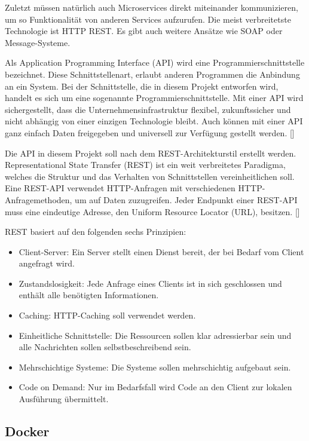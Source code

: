 Zuletzt müssen natürlich auch Microservices direkt miteinander kommunizieren, um so Funktionalität von anderen Services aufzurufen. Die meist verbreitetste Technologie ist HTTP REST. Es gibt auch weitere Ansätze wie SOAP oder Message-Systeme.

Als Application Programming Interface (API) wird eine Programmierschnittstelle bezeichnet. Diese Schnittstellenart, erlaubt anderen Programmen die Anbindung an ein System. Bei der Schnittstelle, die in diesem Projekt entworfen wird, handelt es sich um eine sogenannte Programmierschnittstelle. Mit einer API wird sichergestellt, dass die Unternehmensinfrastruktur flexibel, zukunftssicher und nicht abhängig von einer einzigen Technologie bleibt. Auch können mit einer API ganz einfach Daten freigegeben und universell zur Verfügung gestellt werden. [\cite[S. 95ff]{koflerDigitale2018}]

Die API in diesem Projekt soll nach dem REST-Architekturstil erstellt werden. Representational State Transfer (REST) ist ein weit verbreitetes Paradigma, welches die Struktur und das Verhalten von Schnittstellen vereinheitlichen soll. Eine REST-API verwendet HTTP-Anfragen mit verschiedenen HTTP-Anfragemethoden, um auf Daten zuzugreifen. Jeder Endpunkt einer REST-API muss eine eindeutige Adresse, den Uniform Resource Locator (URL), besitzen. [\cite[S. 76ff]{fieldingArchitectural2000}]

REST basiert auf den folgenden sechs Prinzipien:
\begin{itemize}
\item Client-Server: Ein Server stellt einen Dienst bereit, der bei Bedarf vom Client angefragt wird.
\item Zustandslosigkeit: Jede Anfrage eines Clients ist in sich geschlossen und enthält alle benötigten Informationen.
\item Caching: HTTP-Caching soll verwendet werden.
\item Einheitliche Schnittstelle: Die Ressourcen sollen klar adressierbar sein und alle Nachrichten sollen selbstbeschreibend sein.
\item Mehrschichtige Systeme: Die Systeme sollen mehrschichtig aufgebaut sein.
\item Code on Demand: Nur im Bedarfsfall wird Code an den Client zur lokalen Ausführung übermittelt.
\end{itemize}


\subsection{Docker}

